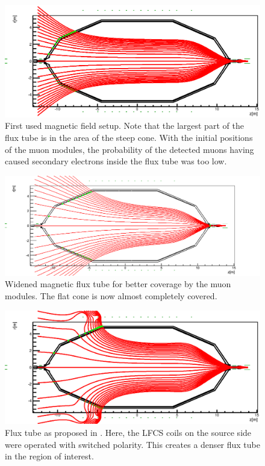   \begin{figure}
	\centerline{\includegraphics[width = 1.1\textwidth]{graphics/analysis/mainSpec/fieldSimulation/fieldlines_100A.eps}}
	\caption[Flux tube setting A]{First used magnetic field setup. Note that the largest part of the flux tube is in the area of the steep cone. With the initial positions of the muon modules, the probability of the detected muons having caused secondary electrons inside the flux tube was too low.}
  	\label{fig:mainSpec_100A}
  \end{figure}


  \begin{figure}
	\centerline{\includegraphics[width = 1.1\textwidth]{graphics/analysis/mainSpec/fieldSimulation/fieldlines.png}}
	\caption[Flux tube setting B]{Widened magnetic flux tube for better coverage by the muon modules. The flat cone is now almost completely covered.}
  	\label{fig:mainSpec_B}
  \end{figure}

  
  \begin{figure}
	\centerline{\includegraphics[width = 1.1\textwidth]{graphics//analysis/mainSpec/fieldSimulation/fieldlines_9.eps}}
	\caption[Flux tube setting C]{Flux tube as proposed in \cite{proposalM12}. Here, the LFCS coils on the source side were operated with switched polarity. This creates a denser flux tube in the region of interest.}
  	\label{fig:mainSpec_9}
  \end{figure}

